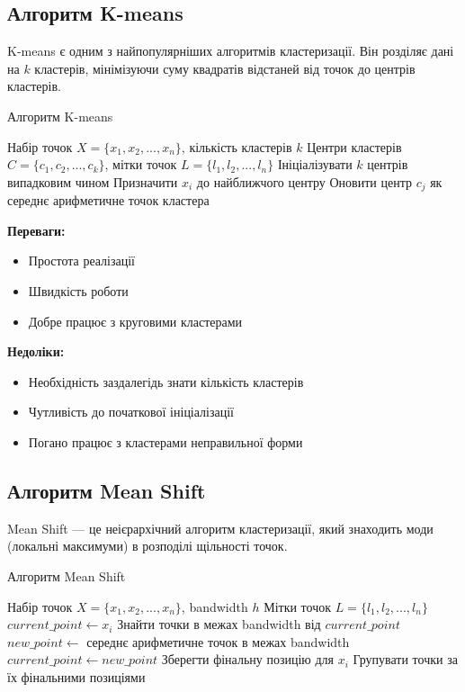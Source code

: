 \documentclass[12pt,a4paper]{article}
\begin{document}
\subsection{Алгоритм K-means}

K-means є одним з найпопулярніших алгоритмів кластеризації. Він розділяє дані на $k$ кластерів, мінімізуючи суму квадратів відстаней від точок до центрів кластерів.

\begin{algorithm}[H]
\caption{Алгоритм K-means}
\begin{algorithmic}[1]
\REQUIRE Набір точок $X = \{x_1, x_2, ..., x_n\}$, кількість кластерів $k$
\ENSURE Центри кластерів $C = \{c_1, c_2, ..., c_k\}$, мітки точок $L = \{l_1, l_2, ..., l_n\}$
\STATE Ініціалізувати $k$ центрів випадковим чином
\REPEAT
        \STATE Призначити $x_i$ до найближчого центру
    \ENDFOR
        \STATE Оновити центр $c_j$ як середнє арифметичне точок кластера
    \ENDFOR
{}
\end{algorithmic}
\end{algorithm}

\textbf{Переваги:}
\begin{itemize}
    \item Простота реалізації
    \item Швидкість роботи
    \item Добре працює з круговими кластерами
\end{itemize}

\textbf{Недоліки:}
\begin{itemize}
    \item Необхідність заздалегідь знати кількість кластерів
    \item Чутливість до початкової ініціалізації
    \item Погано працює з кластерами неправильної форми
\end{itemize}

\subsection{Алгоритм Mean Shift}

Mean Shift — це неієрархічний алгоритм кластеризації, який знаходить моди (локальні максимуми) в розподілі щільності точок.

\begin{algorithm}[H]
\caption{Алгоритм Mean Shift}
\begin{algorithmic}[1]
\REQUIRE Набір точок $X = \{x_1, x_2, ..., x_n\}$, bandwidth $h$
\ENSURE Мітки точок $L = \{l_1, l_2, ..., l_n\}$
    \STATE $current\_point \leftarrow x_i$
    \REPEAT
        \STATE Знайти точки в межах bandwidth від $current\_point$
        \STATE $new\_point \leftarrow$ середнє арифметичне точок в межах bandwidth
        \STATE $current\_point \leftarrow new\_point$
    \STATE Зберегти фінальну позицію для $x_i$
\ENDFOR
\STATE Групувати точки за їх фінальними позиціями
\end{algorithmic}
\end{algorithm}
\end{document}
